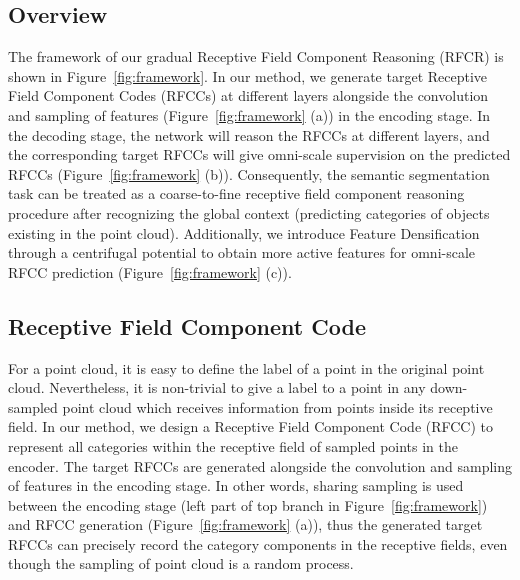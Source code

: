 \documentclass[final]{cvpr}
\begin{document}
\subsection{Overview}
\label{subsec:overview}

The framework of our gradual Receptive Field Component Reasoning (RFCR) is shown in Figure~\ref{fig:framework}. In our method, we generate target Receptive Field Component Codes (RFCCs) at different layers alongside the convolution and sampling of features (Figure~\ref{fig:framework} (a)) in the encoding stage. In the decoding stage, the network will reason the RFCCs at different layers, and the corresponding target RFCCs will give omni-scale supervision on the predicted RFCCs (Figure~\ref{fig:framework} (b)). Consequently, the semantic segmentation task can be treated as a coarse-to-fine receptive field component reasoning procedure after recognizing the global context (predicting categories of objects existing in the point cloud). Additionally, we introduce Feature Densification through a centrifugal potential to obtain more active features for omni-scale RFCC prediction (Figure~\ref{fig:framework} (c)).

\subsection{Receptive Field Component Code}
\label{subsec:rfcc}
For a point cloud, it is easy to define the label of a point in the original point cloud. Nevertheless, it is non-trivial to give a label to a point in any down-sampled point cloud which receives information from points inside its receptive field.
In our method, we design a Receptive Field Component Code (RFCC) to represent all categories within the receptive field of sampled points in the encoder. The target RFCCs are generated alongside the convolution and sampling of features in the encoding stage. In other words, sharing sampling is used between the encoding stage (left part of top branch in Figure~\ref{fig:framework}) and RFCC generation (Figure~\ref{fig:framework} (a)), thus the generated target RFCCs can precisely record the category components in the receptive fields, even though the sampling of point cloud is a random process.
\end{document}
